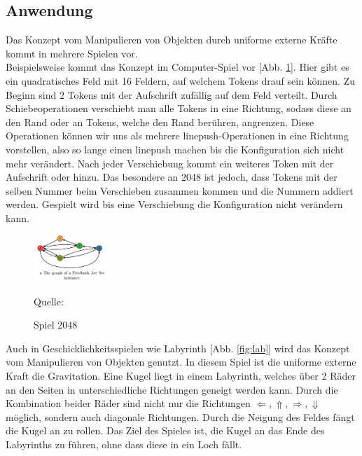 \documentclass[seminar,german]{algothesis}
\newcommand*{\quelle}{%
  \footnotesize Quelle:
}
\begin{document}
\subsection{Anwendung}
Das Konzept vom Manipulieren von Objekten durch uniforme externe Kräfte kommt in mehrere Spielen vor.\\
Beispielsweise kommt das Konzept im Computer-Spiel \grqq{} vor [Abb. \ref{fig:2}]. Hier gibt es ein quadratisches Feld mit 16 Feldern, auf welchem Tokens drauf sein können. Zu Beginn sind 2 Tokens mit der Aufschrift \grqq{} zufällig auf dem Feld verteilt. Durch Schiebeoperationen verschiebt man alle Tokens in eine Richtung, sodass diese an den Rand oder an Tokens, welche den Rand berühren, angrenzen. Diese Operationen können wir uns als mehrere linepush-Operationen in eine Richtung vorstellen, also so lange einen linepush machen bis die Konfiguration sich nicht mehr verändert. Nach jeder Verschiebung kommt ein weiteres Token mit der Aufschrift \grqq{} oder \grqq{} hinzu. Das besondere an 2048 ist jedoch, dass Tokens mit der selben Nummer beim Verschieben zusammen kommen und die Nummern addiert werden. Gespielt wird bis eine Verschiebung die Konfiguration nicht verändern kann.


\begin{figure}[ht]
	\centering
	\includegraphics[width=0.25\textwidth]{graph}
	\caption{Spiel 2048}
	\quelle\cite{2048}
	\label{fig:2}
\end{figure}

\noindent
Auch in Geschicklichkeitsspielen wie \glqq Labyrinth\grqq{} [Abb. \ref{fig:lab}] wird das Konzept vom Manipulieren von Objekten genutzt. In diesem Spiel ist die uniforme externe Kraft die Gravitation. Eine Kugel liegt in einem Labyrinth, welches über 2 Räder an den Seiten in unterschiedliche Richtungen geneigt werden kann. Durch die Kombination beider Räder sind nicht nur die Richtungen $\Leftarrow, \Uparrow, \Rightarrow, \Downarrow$ möglich, sondern auch diagonale Richtungen. Durch die Neigung des Feldes fängt die Kugel an zu rollen. Das Ziel des Spieles ist, die Kugel an das Ende des Labyrinths zu führen, ohne dass diese in ein Loch fällt.
\end{document}
